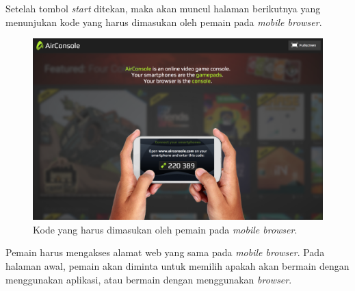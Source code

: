 Setelah tombol \textit{start} ditekan, maka akan muncul halaman berikutnya yang menunjukan kode yang harus dimasukan oleh pemain pada \textit{mobile browser}. 

\begin{figure}[H]
	\centering
	\includegraphics[scale=0.3]{Gambar/con2_code1}
	\caption{Kode yang harus dimasukan oleh pemain pada \textit{mobile browser}.}
	\label{fig:17_con2_code1}
\end{figure}

Pemain harus mengakses alamat web yang sama pada \textit{mobile browser}. Pada halaman awal, pemain akan diminta untuk memilih apakah akan bermain dengan menggunakan aplikasi, atau bermain dengan menggunakan \textit{browser}. 

